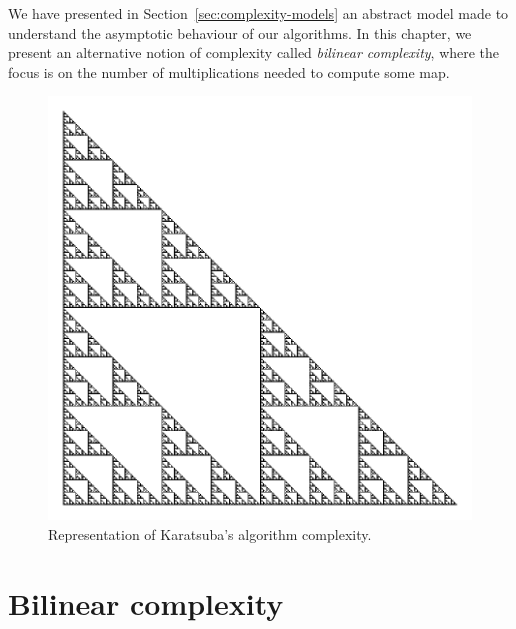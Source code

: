 We have presented in Section~\ref{sec:complexity-models} an abstract model made
to understand the asymptotic behaviour of our algorithms. In this chapter, we
present an alternative notion of complexity called \emph{bilinear complexity},
where the focus is on the number of multiplications needed to compute some map.
\minitoc

\begin{figure}[h]
  \centering
  \includegraphics[scale=0.5]{img/karatsuba.pdf}
  \caption{Representation of Karatsuba's algorithm complexity.}
  \label{fig:karatsuba}
\end{figure}
\clearpage

\section{Bilinear complexity}

